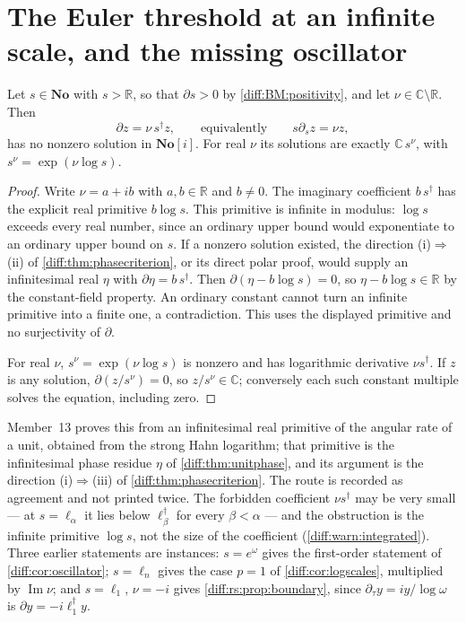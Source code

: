 \documentclass[11pt,letterpaper]{article}
\numberwithin{equation}{section}
\theoremstyle{definition}
\theoremstyle{remark}
\newcommand{\No}{\mathbf{No}}
\newcommand{\SC}{\mathbf{No}[i]}
\newcommand{\R}{\mathbb R}
\newcommand{\C}{\mathbb C}
\newcommand{\der}{\partial}
\newcommand{\Imm}{\operatorname{Im}}
\newcommand{\derT}{\der_{\tau}}
\begin{document}
\section{The Euler threshold at an infinite scale, and the missing oscillator}
\label{diff:cp:sec:euler}

\begin{corollary}
\label{diff:cp:cor:nonreal}
Let $s\in\No$ with $s>\R$, so that $\der s>0$ by \ref{diff:BM:positivity},
and let $\nu\in\C\setminus\R$. Then
\begin{equation}\label{diff:cp:eq:forbidden}
 \der z=\nu\,s^{\dagger}z,\qquad\text{equivalently}\qquad s\der_{s}z=\nu z,
\end{equation}
has no nonzero solution in $\SC$. For real $\nu$ its solutions are exactly
$\C\,s^{\nu}$, with $s^{\nu}=\exp(\nu\log s)$.
\end{corollary}
\begin{proof}
Write $\nu=a+ib$ with $a,b\in\R$ and $b\neq0$.
The imaginary coefficient $b\,s^{\dagger}$ has the explicit real
primitive $b\log s$. This primitive is infinite in modulus:
$\log s$ exceeds every real number, since an ordinary upper bound
would exponentiate to an ordinary upper bound on $s$.
If a nonzero solution existed, the direction
(i)$\Rightarrow$(ii) of \cref{diff:thm:phasecriterion}, or its direct
polar proof, would supply an infinitesimal real $\eta$ with
$\der\eta=b\,s^{\dagger}$. Then
$\der(\eta-b\log s)=0$, so $\eta-b\log s\in\R$ by the
constant-field property. An ordinary constant cannot turn an
infinite primitive into a finite one, a contradiction. This uses
the displayed primitive and no surjectivity of $\der$.

For real $\nu$, $s^{\nu}=\exp(\nu\log s)$ is nonzero and has
logarithmic derivative $\nu s^{\dagger}$. If $z$ is any solution,
$\der(z/s^{\nu})=0$, so $z/s^{\nu}\in\C$; conversely each such
constant multiple solves the equation, including zero.
\end{proof}

Member~13 proves this from an infinitesimal real primitive of the angular rate
of a unit, obtained from the strong Hahn logarithm; that primitive is the
infinitesimal phase residue $\eta$ of \cref{diff:thm:unitphase}, and its
argument is the direction (i)$\Rightarrow$(iii) of
\cref{diff:thm:phasecriterion}. The route is recorded as agreement and not
printed twice. The forbidden coefficient $\nu s^{\dagger}$ may be very small ---
at $s=\ell_{\alpha}$ it lies below $\ell_{\beta}^{\dagger}$ for every
$\beta<\alpha$ --- and the obstruction is the infinite primitive $\log s$, not
the size of the coefficient (\cref{diff:warn:integrated}). Three earlier
statements are instances: $s=e^{\omega}$ gives the first-order statement of
\cref{diff:cor:oscillator}; $s=\ell_{n}$ gives the case $p=1$ of
\cref{diff:cor:logscales}, multiplied by $\Imm\nu$; and $s=\ell_{1}$,
$\nu=-i$ gives \cref{diff:rs:prop:boundary}, since
$\derT y=iy/\log\omega$ is $\der y=-i\ell_{1}^{\dagger}y$.
\end{document}
